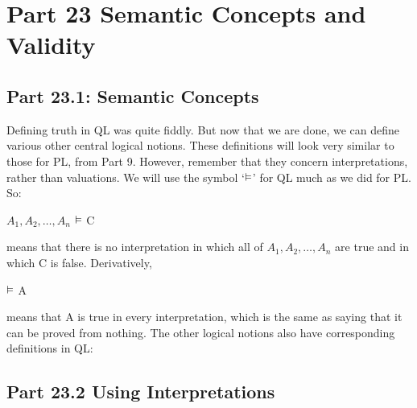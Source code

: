 \ockham

\chapter{Part 23 Semantic Concepts and Validity}
\section{Part 23.1: Semantic Concepts}
Defining truth in QL was quite fiddly. But now that we are done, we can define various other central logical notions. These definitions will look very similar to those for PL, from Part 9. However, remember that they concern interpretations, rather than valuations. We will use the symbol ‘$\vDash$’ for QL much as we did for PL. So:
\begin{center}
$A_1,A_2,\ldots,A_n$ $\vDash$ C
\end{center}
means that there is no interpretation in which all of $A_1,A_2,\ldots,A_n$ are true and in which C is false. Derivatively,
\begin{center}
$\vDash$ A
\end{center}
means that A is true in every interpretation, which is the same as saying that it can be proved from nothing. The other logical notions also have corresponding definitions in QL:
\section{Part 23.2 Using Interpretations}
